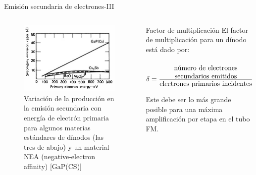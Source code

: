\documentclass[a4paper,10pt]{beamer}
\begin{document}
\begin{frame}[label=milink1]{Emisión secundaria de electrones-III}

\begin{columns}[c]
    \column{2in}
 \begin{figure}
  \center
     \includegraphics[scale=0.4]{fig8}
     \caption{Variación de la producción en la emisión secundaria con energía 
   de electrón primaria para algunos materias estándares de dínodos (las 
   tres de abajo) y un material NEA (negative-electron affinity) [GaP(CS)]}
   \label{fig:fig8}
   \end{figure}
   \column{2in}
 \begin{block}{Factor de multiplicación}
  El factor de multiplicación para un dínodo está dado por:
  \begin{equation*}  
   \delta=\frac{\text{\parbox{12em}{\center número de electrones secundarios emitidos}}}{\text{electrones primarios
   incidentes}}
  \end{equation*}
  \begin{justify}Este debe ser lo más grande posible para una máxima amplificación por etapa 
  en el tubo FM.
  \end{justify}
  \end{block}
  \end{columns}
\end{frame}
\end{document}
